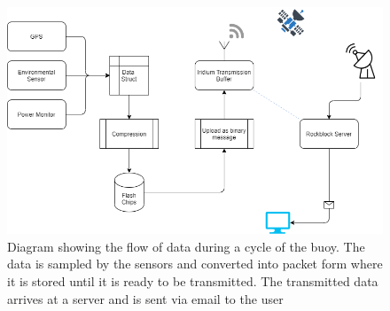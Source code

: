 \begin{figure}[H]
    \centering
    \includegraphics[scale = 0.5]{Data Flow Diagram.png}
    \caption{Diagram showing the flow of data during a cycle of the buoy. The data is sampled by the sensors and converted into packet form where it is stored until it is ready to be transmitted. The transmitted data arrives at a server and is sent via email to the user}
    \label{fig:data_flow}
\end{figure}